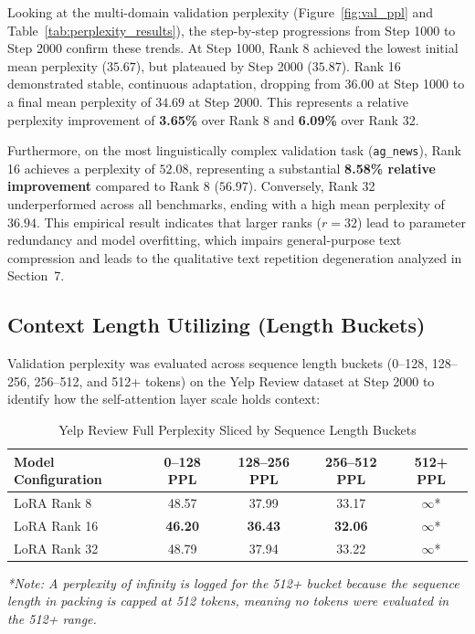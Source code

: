 \documentclass[11pt,a4paper]{article}
\begin{document}
Looking at the multi-domain validation perplexity (Figure~\ref{fig:val_ppl} and Table~\ref{tab:perplexity_results}), the step-by-step progressions from Step 1000 to Step 2000 confirm these trends. At Step 1000, Rank 8 achieved the lowest initial mean perplexity ($35.67$), but plateaued by Step 2000 ($35.87$). Rank 16 demonstrated stable, continuous adaptation, dropping from $36.00$ at Step 1000 to a final mean perplexity of $34.69$ at Step 2000. This represents a relative perplexity improvement of \textbf{3.65\%} over Rank 8 and \textbf{6.09\%} over Rank 32. 

Furthermore, on the most linguistically complex validation task (\texttt{ag\_news}), Rank 16 achieves a perplexity of $52.08$, representing a substantial \textbf{8.58\% relative improvement} compared to Rank 8 ($56.97$). Conversely, Rank 32 underperformed across all benchmarks, ending with a high mean perplexity of $36.94$. This empirical result indicates that larger ranks ($r=32$) lead to parameter redundancy and model overfitting, which impairs general-purpose text compression and leads to the qualitative text repetition degeneration analyzed in Section~7.

\subsection{Context Length Utilizing (Length Buckets)}
Validation perplexity was evaluated across sequence length buckets (0--128, 128--256, 256--512, and 512+ tokens) on the Yelp Review dataset at Step 2000 to identify how the self-attention layer scale holds context:

\begin{table}[h]
\centering
\caption{Yelp Review Full Perplexity Sliced by Sequence Length Buckets}
\label{tab:length_buckets}
\begin{tabular}{lcccc}
\toprule
Model Configuration & 0--128 PPL & 128--256 PPL & 256--512 PPL & 512+ PPL \\
\midrule
LoRA Rank 8  & 48.57 & 37.99 & 33.17 & $\infty$* \\
LoRA Rank 16 & \textbf{46.20} & \textbf{36.43} & \textbf{32.06} & $\infty$* \\
LoRA Rank 32 & 48.79 & 37.94 & 33.22 & $\infty$* \\
\bottomrule
\end{tabular}
\vspace{1.5mm}
\begin{flushleft}
\small{\textit{*Note: A perplexity of infinity is logged for the 512+ bucket because the sequence length in packing is capped at 512 tokens, meaning no tokens were evaluated in the 512+ range.}}
\end{flushleft}
\end{table}
\end{document}

